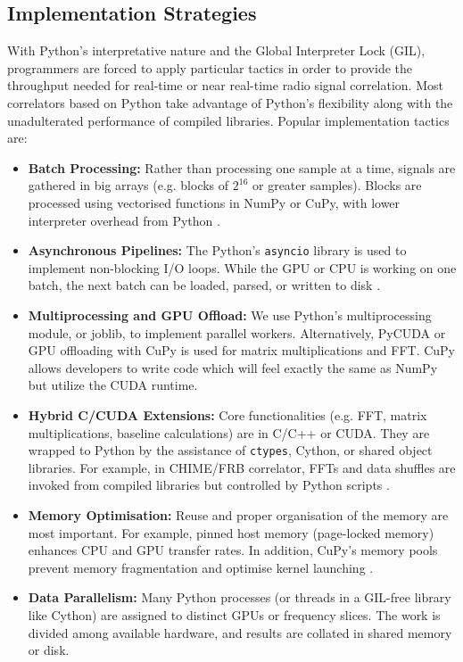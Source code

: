    \subsection{Implementation Strategies}
    With Python's interpretative nature and the Global Interpreter Lock (GIL), programmers are forced to apply particular tactics in order to provide the throughput needed for real-time or near real-time radio signal correlation. Most correlators based on Python take advantage of Python's flexibility along with the unadulterated performance of compiled libraries. Popular implementation tactics are:

    \begin{itemize}
        \item \textbf{Batch Processing:} Rather than processing one sample at a time, signals are gathered in big arrays (e.g. blocks of $2^{16}$ or greater samples). Blocks are processed using vectorised functions in NumPy or CuPy, with lower interpreter overhead from Python \cite{Merry2023}.
              
        \item \textbf{Asynchronous Pipelines:} The Python's \texttt{asyncio} library is used to implement non-blocking I/O loops. While the GPU or CPU is working on one batch, the next batch can be loaded, parsed, or written to disk \cite{Merry2023}.
        
        \item \textbf{Multiprocessing and GPU Offload:}
        We use Python's multiprocessing module, or joblib, to implement parallel workers. Alternatively, PyCUDA or GPU offloading with CuPy is used for matrix multiplications and FFT. CuPy allows developers to write code which will feel exactly the same as NumPy but utilize the CUDA runtime.
        
        \item \textbf{Hybrid C/CUDA Extensions:} Core functionalities (e.g. FFT, matrix multiplications, baseline calculations) are in C/C++ or CUDA. They are wrapped to Python by the assistance of \texttt{ctypes}, Cython, or shared object libraries. For example, in CHIME/FRB correlator, FFTs and data shuffles are invoked from compiled libraries but controlled by Python scripts \cite{Leung2024}.
        
        \item \textbf{Memory Optimisation:} Reuse and proper organisation of the memory are most important. For example, pinned host memory (page-locked memory) enhances CPU and GPU transfer rates. In addition, CuPy's memory pools prevent memory fragmentation and optimise kernel launching \cite{Merry2023}.
        
        \item \textbf{Data Parallelism:} Many Python processes (or threads in a GIL-free library like Cython) are assigned to distinct GPUs or frequency slices. The work is divided among available hardware, and results are collated in shared memory or disk.
    \end{itemize}

